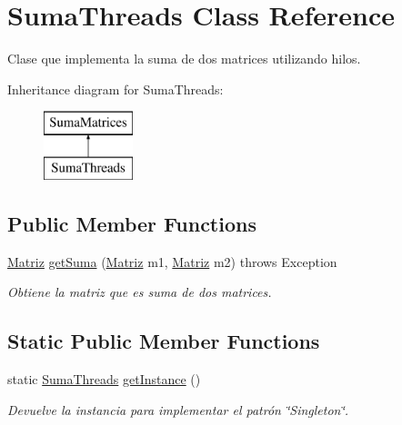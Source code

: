 \hypertarget{classSumaThreads}{\section{Suma\-Threads Class Reference}
\label{classSumaThreads}
}


Clase que implementa la suma de dos matrices utilizando hilos.  


Inheritance diagram for Suma\-Threads\-:\begin{figure}[H]
\begin{center}
\leavevmode
\includegraphics[height=2.000000cm]{classSumaThreads}
\end{center}
\end{figure}
\subsection*{Public Member Functions}
\begin{DoxyCompactItemize}
\item 
\hyperlink{classMatriz}{Matriz} \hyperlink{classSumaThreads_ac799c145a2711fff3ac9b348c8afd881}{get\-Suma} (\hyperlink{classMatriz}{Matriz} m1, \hyperlink{classMatriz}{Matriz} m2)  throws Exception 
\begin{DoxyCompactList}\small\item\em Obtiene la matriz que es suma de dos matrices. \end{DoxyCompactList}\end{DoxyCompactItemize}
\subsection*{Static Public Member Functions}
\begin{DoxyCompactItemize}
\item 
static \hyperlink{classSumaThreads}{Suma\-Threads} \hyperlink{classSumaThreads_ad9b2e7b96e26eee35c767df5f7c11dec}{get\-Instance} ()
\begin{DoxyCompactList}\small\item\em Devuelve la instancia para implementar el patrón \char`\"{}\-Singleton\char`\"{}. \end{DoxyCompactList}\end{DoxyCompactItemize}


